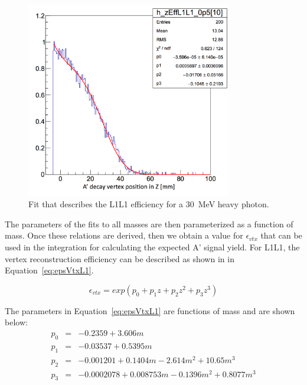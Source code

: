 \begin{figure}[H]
  \centering
      \includegraphics[width=0.8\textwidth]{plots/L1L1_eff_35MeV.png}
      \caption{Fit that describes the L1L1 efficiency for a 30~MeV heavy photon.}
  \label{fig:effFitted}
\end{figure} 

The parameters of the fits to all masses are then parameterized as a function of mass. Once these relations are derived, then we obtain a value for $\epsilon_{vtx}$ that can be used in the integration for calculating the expected A' signal yield. For L1L1, the vertex reconstruction efficiency can be described as shown in in Equation~\eqref{eq:epsVtxL1}.

\begin{equation}
\label{eq:epsVtxL1}
\epsilon_{vtx} = exp(p_0+p_1z+p_2z^2+p_3z^3) 
\end{equation}

The parameters in Equation~\eqref{eq:epsVtxL1} are functions of mass and are shown below:
\begin{eqnarray*}
\label{eq:parsEpsVtxL1}
p_0 & = & -0.2359+3.606m\\
p_1 & = & -0.03537+0.5395m \\
p_2 & = & -0.001201+0.1404m-2.614m^2+10.65m^3 \\
p_3 & = & -0.0002078+0.008753m-0.1396m^2+0.8077m^3\\
\end{eqnarray*}

